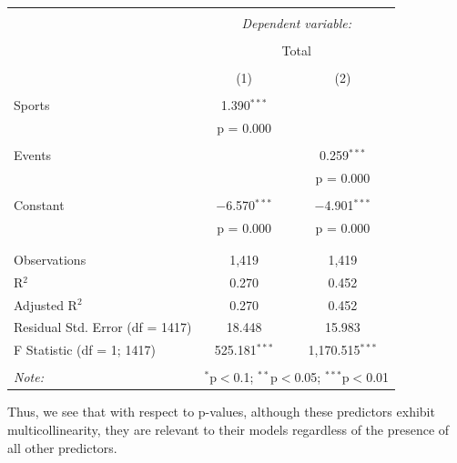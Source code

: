 \documentclass{mcmthesis}
\begin{document}
\begin{longtable}{@{\extracolsep{5pt}}lcc} 
    \caption{}
    \label{}
\\[-1.8ex]\hline 
\hline \\[-1.8ex] 
 & \multicolumn{2}{c}{\textit{Dependent variable:}} \\ 
\cline{2-3} 
\\[-1.8ex] & \multicolumn{2}{c}{Total} \\ 
\\[-1.8ex] & (1) & (2)\\ 
\hline \\[-1.8ex] 
 Sports & 1.390$^{***}$ &  \\ 
  & p = 0.000 &  \\ 
  & & \\ 
 Events &  & 0.259$^{***}$ \\ 
  &  & p = 0.000 \\ 
  & & \\ 
 Constant & $-$6.570$^{***}$ & $-$4.901$^{***}$ \\ 
  & p = 0.000 & p = 0.000 \\ 
  & & \\ 
\hline \\[-1.8ex] 
Observations & 1,419 & 1,419 \\ 
R$^{2}$ & 0.270 & 0.452 \\ 
Adjusted R$^{2}$ & 0.270 & 0.452 \\ 
Residual Std. Error (df = 1417) & 18.448 & 15.983 \\ 
F Statistic (df = 1; 1417) & 525.181$^{***}$ & 1,170.515$^{***}$ \\ 
\hline 
\hline \\[-1.8ex] 
\textit{Note:}  & \multicolumn{2}{r}{$^{*}$p$<$0.1; $^{**}$p$<$0.05; $^{***}$p$<$0.01} \\ 
\end{longtable} 

Thus, we see that with respect to p-values, although these predictors exhibit multicollinearity, they are relevant to their models regardless of the presence of all other predictors. 

\end{document}
